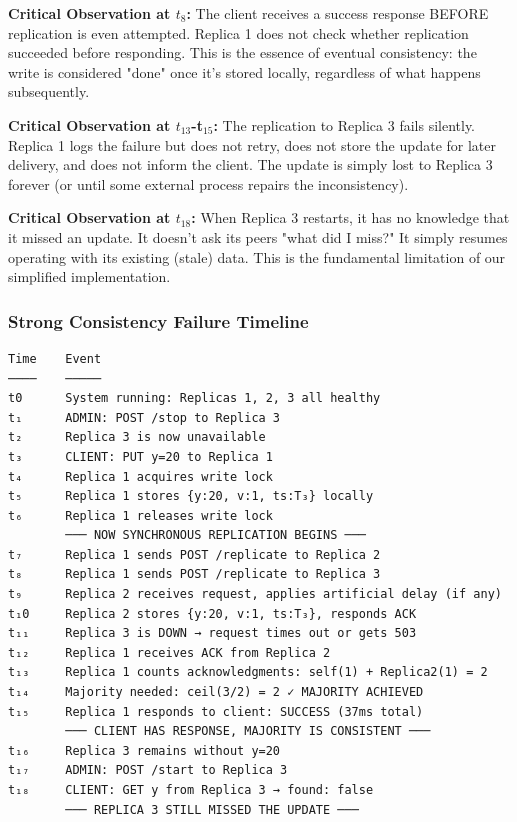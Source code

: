\documentclass[10pt,a4paper]{article}
\begin{document}
\textbf{Critical Observation at $t_8$:} The client receives a success response BEFORE replication is even attempted. Replica 1 does not check whether replication succeeded before responding. This is the essence of eventual consistency: the write is considered "done" once it's stored locally, regardless of what happens subsequently.

\textbf{Critical Observation at $t_{13}$-t$_{15}$:} The replication to Replica 3 fails silently. Replica 1 logs the failure but does not retry, does not store the update for later delivery, and does not inform the client. The update is simply lost to Replica 3 forever (or until some external process repairs the inconsistency).

\textbf{Critical Observation at $t_{18}$:} When Replica 3 restarts, it has no knowledge that it missed an update. It doesn't ask its peers "what did I miss?" It simply resumes operating with its existing (stale) data. This is the fundamental limitation of our simplified implementation.

\subsubsection{Strong Consistency Failure Timeline}

\begin{verbatim}
Time    Event
────    ─────
t0      System running: Replicas 1, 2, 3 all healthy
t₁      ADMIN: POST /stop to Replica 3
t₂      Replica 3 is now unavailable
t₃      CLIENT: PUT y=20 to Replica 1
t₄      Replica 1 acquires write lock
t₅      Replica 1 stores {y:20, v:1, ts:T₃} locally
t₆      Replica 1 releases write lock
        ─── NOW SYNCHRONOUS REPLICATION BEGINS ───
t₇      Replica 1 sends POST /replicate to Replica 2
t₈      Replica 1 sends POST /replicate to Replica 3
t₉      Replica 2 receives request, applies artificial delay (if any)
t₁0     Replica 2 stores {y:20, v:1, ts:T₃}, responds ACK
t₁₁     Replica 3 is DOWN → request times out or gets 503
t₁₂     Replica 1 receives ACK from Replica 2
t₁₃     Replica 1 counts acknowledgments: self(1) + Replica2(1) = 2
t₁₄     Majority needed: ceil(3/2) = 2 ✓ MAJORITY ACHIEVED
t₁₅     Replica 1 responds to client: SUCCESS (37ms total)
        ─── CLIENT HAS RESPONSE, MAJORITY IS CONSISTENT ───
t₁₆     Replica 3 remains without y=20
t₁₇     ADMIN: POST /start to Replica 3
t₁₈     CLIENT: GET y from Replica 3 → found: false
        ─── REPLICA 3 STILL MISSED THE UPDATE ───
\end{verbatim}
\end{document}

